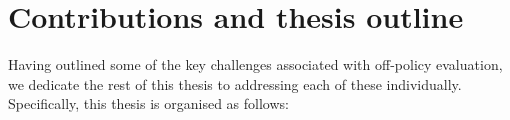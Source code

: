 












\section{Contributions and thesis outline}
Having outlined some of the key challenges associated with off-policy evaluation, we dedicate the rest of this thesis to addressing each of these individually.
Specifically, this thesis is organised as follows:

